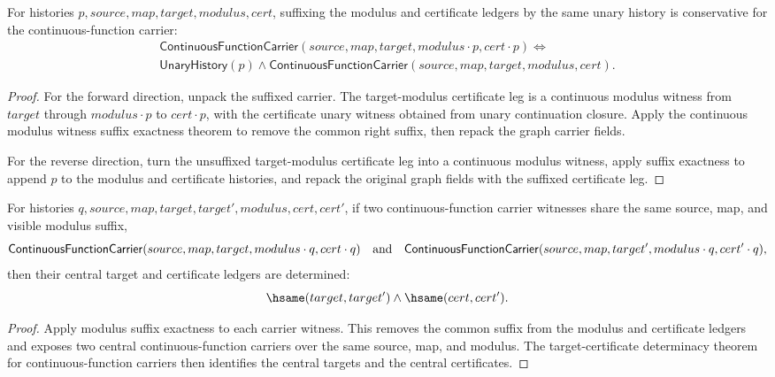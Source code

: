 \begin{theorem}
\label{thm:continuous-function-carrier-modulus-suffix-iff}
For histories $p,source,map,target,modulus,cert$, suffixing the modulus and
certificate ledgers by the same unary history is conservative for the
continuous-function carrier:
$$
\begin{array}{l}
\mathsf{ContinuousFunctionCarrier}(source,map,target,modulus\cdot p,cert\cdot p)
\Longleftrightarrow
\\
\mathsf{UnaryHistory}(p)\wedge
\mathsf{ContinuousFunctionCarrier}(source,map,target,modulus,cert).
\end{array}
$$
\end{theorem}
\begin{proof}
For the forward direction, unpack the suffixed carrier. The target-modulus
certificate leg is a continuous modulus witness from $target$ through
$modulus\cdot p$ to $cert\cdot p$, with the certificate unary witness obtained
from unary continuation closure. Apply the continuous modulus witness suffix
exactness theorem to remove the common right suffix, then repack the graph
carrier fields.

For the reverse direction, turn the unsuffixed target-modulus certificate leg
into a continuous modulus witness, apply suffix exactness to append $p$ to the
modulus and certificate histories, and repack the original graph fields with
the suffixed certificate leg.
\end{proof}

\begin{theorem}
\label{thm:continuous-function-carrier-modulus-suffix-target-cert-deterministic}
For histories $q,source,map,target,target',modulus,cert,cert'$, if two
continuous-function carrier witnesses share the same source, map, and visible
modulus suffix,
$$
\mathsf{ContinuousFunctionCarrier}(source,map,target,modulus\cdot q,cert\cdot q)
\quad\hbox{and}\quad
\mathsf{ContinuousFunctionCarrier}(source,map,target',modulus\cdot q,cert'\cdot q),
$$
then their central target and certificate ledgers are determined:
$$
\hsame(target,target')\land\hsame(cert,cert').
$$
\end{theorem}
\begin{proof}
Apply modulus suffix exactness to each carrier witness. This removes the common
suffix from the modulus and certificate ledgers and exposes two central
continuous-function carriers over the same source, map, and modulus. The
target-certificate determinacy theorem for continuous-function carriers then
identifies the central targets and the central certificates.
\end{proof}

